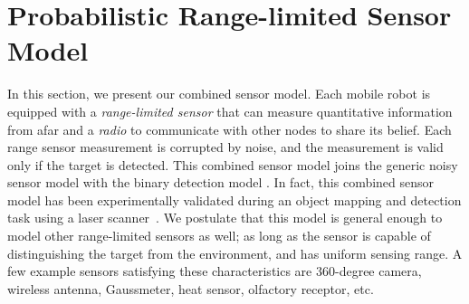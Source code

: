 \documentclass[letterpaper, 10 pt, conference]{ieeeconf}
\newcommand{\Ram}[1]{{\normalsize{\textbf{({\color{green}Ram:\ }#1)}}}}
\begin{document}



\section{Probabilistic Range-limited Sensor Model}
\label{sec:sec3}
In this section, we present our combined sensor model. Each mobile robot is equipped with a \emph{range-limited sensor} that can measure quantitative information from afar and a \emph{radio} to communicate with other nodes to share its belief. 
Each range sensor measurement is corrupted by noise, and the measurement is valid only if the target is detected.
This combined sensor model joins the generic noisy sensor model with the binary detection model \cite{viswanathan1997distributed,djuric2008target}.
In fact, this combined sensor model has been experimentally validated during an object mapping and detection task using a laser scanner~\cite{anguelov2004detecting}.
We postulate that this model is general enough to model other range-limited sensors as well; as long as the sensor is capable of distinguishing the target from the environment, and has uniform sensing range. 
A few example sensors satisfying these characteristics are 360-degree camera, wireless antenna, Gaussmeter, heat sensor, olfactory receptor, etc.
\end{document}
